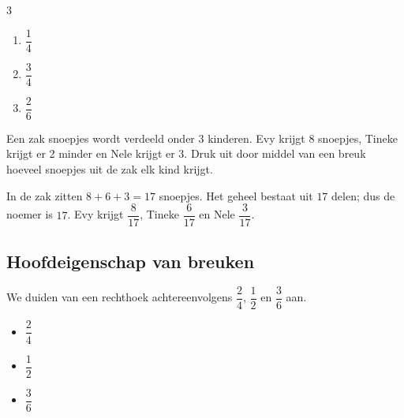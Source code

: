 \documentclass{bis}
\begin{document}
\begin{solution}
\begin{multicols}{3}
\begin{enumerate}
  \item $\dfrac{1}{4}$
  \item $\dfrac{3}{4}$
  \item $\dfrac{2}{6}$
\end{enumerate}
\end{multicols}
\end{solution}

\begin{exercise}
Een zak snoepjes wordt verdeeld onder 3 kinderen. Evy krijgt 8 snoepjes, Tineke krijgt er 2 minder en Nele krijgt er 3. Druk uit door middel van een breuk hoeveel snoepjes uit de zak elk kind krijgt.
\end{exercise}

\begin{solution}
In de zak zitten $8 + 6 + 3 = 17$ snoepjes.
Het geheel bestaat uit $17$ delen; dus de noemer is $17$.
Evy krijgt $\dfrac{8}{17}$, Tineke $\dfrac{6}{17}$ en Nele $\dfrac{3}{17}$.
\end{solution}

\subsection{Hoofdeigenschap van breuken}

We duiden van een rechthoek achtereenvolgens $\dfrac{2}{4}$, $\dfrac{1}{2}$ en $\dfrac{3}{6}$ aan.

\begin{itemize}
  \item $\dfrac{2}{4}$\hspace*{1em}
  \item $\dfrac{1}{2}$\hspace*{1em}
  \item $\dfrac{3}{6}$\hspace*{1em}
\end{itemize}
\end{document}
